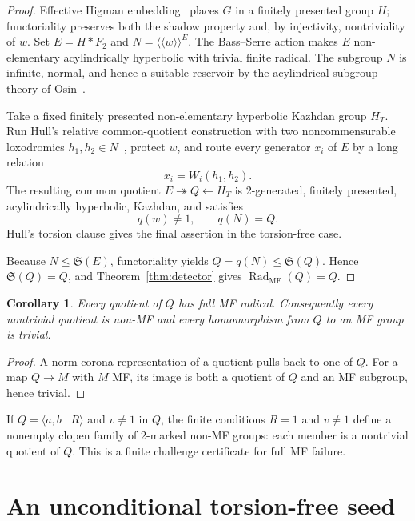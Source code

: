 \documentclass[10pt]{amsart}
\newtheorem{corollary}[theorem]{Corollary}
\theoremstyle{definition}
\theoremstyle{remark}
\newcommand{\Shadow}{\mathfrak S}
\newcommand{\MFRad}{\operatorname{Rad}_{\mathrm{MF}}}
\newcommand{\Normal}[1]{\langle\!\langle #1\rangle\!\rangle}
\begin{document}
\begin{proof}
Effective Higman embedding~\cite{Higman} places $G$ in a finitely presented group $H$;
functoriality preserves both the shadow property and, by injectivity,
nontriviality of $w$.  Set $E=H*F_2$ and
$N=\Normal{w}^{E}$.  The Bass--Serre action makes $E$ non-elementary
acylindrically hyperbolic with trivial finite radical.  The subgroup $N$ is
infinite, normal, and hence a suitable reservoir by the acylindrical subgroup
theory of Osin~\cite{Osin}.

Take a fixed finitely presented non-elementary hyperbolic Kazhdan group
$H_T$.  Run Hull's relative common-quotient construction with two
noncommensurable loxodromics $h_1,h_2\in N$~\cite{Hull}, protect $w$, and route every
generator $x_i$ of $E$ by a long relation
\[
 x_i=W_i(h_1,h_2).
\]
The resulting common quotient $E\twoheadrightarrow Q\leftarrow H_T$ is
2-generated, finitely presented, acylindrically hyperbolic, Kazhdan, and
satisfies
\[
 q(w)\neq1,
 \qquad q(N)=Q.
\]
Hull's torsion clause gives the final assertion in the torsion-free case.

Because $N\leq\Shadow(E)$, functoriality yields
$Q=q(N)\leq\Shadow(Q)$.  Hence $\Shadow(Q)=Q$, and
Theorem~\ref{thm:detector} gives $\MFRad(Q)=Q$.
\end{proof}

\begin{corollary}\label{cor:quotients}
Every quotient of $Q$ has full MF radical.  Consequently every nontrivial
quotient is non-MF and every homomorphism from $Q$ to an MF group is trivial.
\end{corollary}

\begin{proof}
A norm-corona representation of a quotient pulls back to one of $Q$.  For a
map $Q\to M$ with $M$ MF, its image is both a quotient of $Q$ and an MF
subgroup, hence trivial.
\end{proof}

If $Q=\langle a,b\mid R\rangle$ and $v\neq1$ in $Q$, the finite conditions
$R=1$ and $v\neq1$ define a nonempty clopen family of 2-marked non-MF groups:
each member is a nontrivial quotient of $Q$.  This is a finite challenge
certificate for full MF failure.

\section{An unconditional torsion-free seed}
\end{document}
